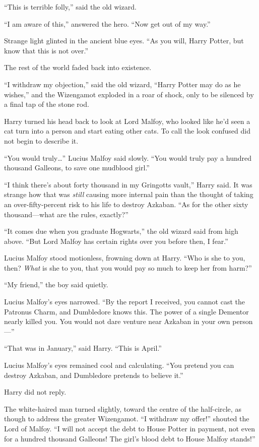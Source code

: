 “This is terrible folly,” said the old wizard.

“I am aware of this,” answered the hero. “Now get out of my way.”

Strange light glinted in the ancient blue eyes. “As you will, Harry Potter, but know that this is not over.”

The rest of the world faded back into existence.

“I withdraw my objection,” said the old wizard, “Harry Potter may do as he wishes,” and the Wizengamot exploded in a roar of shock, only to be silenced by a final tap of the stone rod.

Harry turned his head back to look at Lord Malfoy, who looked like he’d seen a cat turn into a person and start eating other cats. To call the look confused did not begin to describe it.

“You would truly…” Lucius Malfoy said slowly. “You would truly pay a hundred thousand Galleons, to save one mudblood girl.”

“I think there’s about forty thousand in my Gringotts vault,” Harry said. It was strange how that was \emph{still} causing more internal pain than the thought of taking an over-fifty-percent risk to his life to destroy Azkaban. “As for the other sixty thousand—what are the rules, exactly?”

“It comes due when you graduate Hogwarts,” the old wizard said from high above. “But Lord Malfoy has certain rights over you before then, I fear.”

Lucius Malfoy stood motionless, frowning down at Harry. “Who is she to you, then? \emph{What} is she to you, that you would pay so much to keep her from harm?”

“My friend,” the boy said quietly.

Lucius Malfoy’s eyes narrowed. “By the report I received, you cannot cast the Patronus Charm, and Dumbledore knows this. The power of a single Dementor nearly killed you. You would not dare venture near Azkaban in your own person—”

“That was in January,” said Harry. “This is April.”

Lucius Malfoy’s eyes remained cool and calculating. “You pretend you can destroy Azkaban, and Dumbledore pretends to believe it.”

Harry did not reply.

The white-haired man turned slightly, toward the centre of the half-circle, as though to address the greater Wizengamot. “I withdraw my offer!” shouted the Lord of Malfoy. “I will not accept the debt to House Potter in payment, not even for a hundred thousand Galleons! The girl’s blood debt to House Malfoy stands!”

